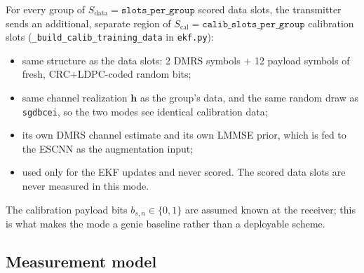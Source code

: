 \documentclass{article}
\begin{document}
For every group of $S_{\text{data}}=\texttt{slots\_per\_group}$ scored data slots, the
transmitter sends an additional, separate region of $S_{\text{cal}}=\texttt{calib\_slots\_per\_group}$
calibration slots (\texttt{\_build\_calib\_training\_data} in \texttt{ekf.py}):
\begin{itemize}[itemsep=2pt]
  \item same structure as the data slots: 2 DMRS symbols $+$ 12 payload symbols of fresh,
  CRC+LDPC-coded random bits;
  \item same channel realization $\mathbf{h}$ as the group's data, and the same random draw as
  \texttt{sgdbcei}, so the two modes see identical calibration data;
  \item its own DMRS channel estimate and its own LMMSE prior, which is fed to the ESCNN as the
  augmentation input;
  \item used only for the EKF updates and never scored. The scored data slots are never
  measured in this mode.
\end{itemize}
The calibration payload bits $b_{s,n}\in\{0,1\}$ are assumed known at the receiver; this is what
makes the mode a genie baseline rather than a deployable scheme.

\subsection{Measurement model}
\end{document}
